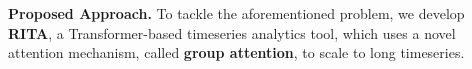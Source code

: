 






\noindent\textbf{Proposed Approach.} 
To tackle the aforementioned problem, we develop \textbf{RITA}, a Transformer-based timeseries analytics tool, which uses a novel attention mechanism, called {\bf group attention}, to scale to long timeseries.

